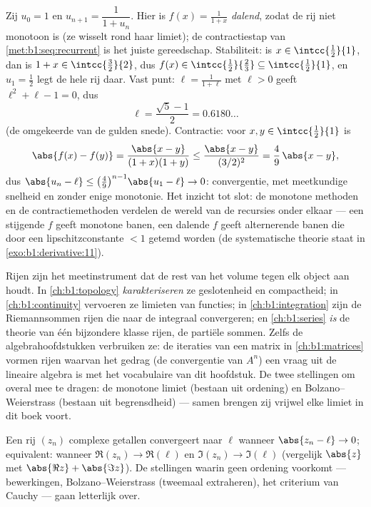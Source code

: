 \begin{example}\label{ex:b1:seq:golden}
Zij $u_0 = 1$ en $u_{n+1} = \dfrac{1}{1 + u_n}$. Hier is $f(x) =
\frac{1}{1+x}$ \emph{dalend}, zodat de rij niet monotoon is (ze wisselt
rond haar limiet); de contractiestap van \cref{met:b1:seq:recurrent} is
het juiste gereedschap. Stabiliteit: is $x \in \intcc{\frac12}{1}$, dan
is $1 + x \in \intcc{\frac32}{2}$, dus $f(x) \in
\intcc{\frac12}{\frac23} \subseteq \intcc{\frac12}{1}$, en $u_1 =
\frac12$ legt de hele rij daar. Vast punt: $\ell = \frac{1}{1+\ell}$ met
$\ell > 0$ geeft $\ell^2 + \ell - 1 = 0$, dus
\[
\ell = \frac{\sqrt5 - 1}{2} = 0.6180\dots
\]
(de omgekeerde van de gulden snede). Contractie: voor $x, y \in
\intcc{\frac12}{1}$ is
\[
\abs{f(x) - f(y)} = \frac{\abs{x - y}}{(1+x)(1+y)}
\leq \frac{\abs{x-y}}{(3/2)^2} = \frac49\,\abs{x - y} ,
\]
dus $\abs{u_n - \ell} \leq \bigl(\frac49\bigr)^{n-1}\abs{u_1 - \ell} \to
0$: convergentie, met meetkundige snelheid en zonder enige monotonie. Het
inzicht tot slot: de monotone methoden en de contractiemethoden verdelen
de wereld van de recursies onder elkaar --- een stijgende $f$ geeft
monotone banen, een dalende $f$ geeft alternerende banen die door een
lipschitzconstante $< 1$ getemd worden (de systematische theorie staat in
\cref{exo:b1:derivative:11}).
\end{example}

\begin{remark}
Rijen zijn het meetinstrument dat de rest van het volume tegen elk object
aan houdt. In \cref{ch:b1:topology} \emph{karakteriseren} ze
geslotenheid en compactheid; in \cref{ch:b1:continuity} vervoeren ze
limieten van functies; in \cref{ch:b1:integration} zijn de Riemannsommen
rijen die naar de integraal convergeren; en \cref{ch:b1:series} \emph{is}
de theorie van één bijzondere klasse rijen, de partiële sommen. Zelfs de
algebrahoofdstukken verbruiken ze: de iteraties van een matrix in
\cref{ch:b1:matrices} vormen rijen waarvan het gedrag (de convergentie
van $A^n$) een vraag uit de lineaire algebra is met het vocabulaire van
dit hoofdstuk. De twee stellingen om overal mee te dragen: de monotone
limiet (bestaan uit ordening) en Bolzano--Weierstrass (bestaan uit
begrensdheid) --- samen brengen zij vrijwel elke limiet in dit boek
voort.
\end{remark}

\begin{remark}
Een rij $(z_n)$ complexe getallen convergeert naar $\ell$ wanneer
$\abs{z_n - \ell} \to 0$; equivalent: wanneer $\Re(z_n) \to \Re(\ell)$ en
$\Im(z_n) \to \Im(\ell)$ (vergelijk $\abs{z}$ met $\abs{\Re z} + \abs{\Im
z}$). De stellingen waarin geen ordening voorkomt --- bewerkingen,
Bolzano--Weierstrass (tweemaal extraheren), het criterium van Cauchy ---
gaan letterlijk over.
\end{remark}

